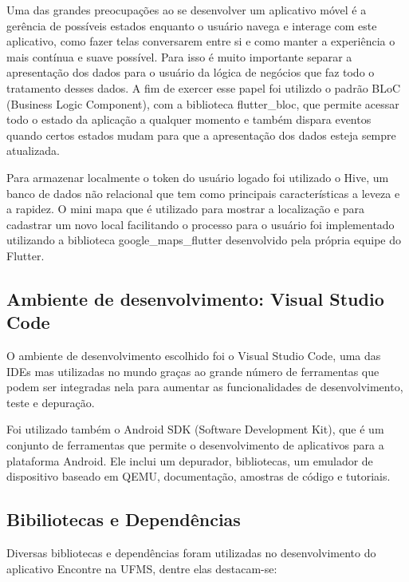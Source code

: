 Uma das grandes preocupações ao se desenvolver um aplicativo móvel é a gerência de possíveis estados enquanto o usuário navega e interage com este aplicativo, como fazer telas conversarem entre si e como manter a experiência o mais contínua e suave possível. Para isso é muito importante separar a apresentação dos dados para o usuário da lógica de negócios que faz todo o tratamento desses dados. A fim de exercer esse papel foi utilizdo o padrão BLoC (Business Logic Component), com a biblioteca flutter\_bloc, que permite acessar todo o estado da aplicação a qualquer momento e também dispara eventos quando certos estados mudam para que a apresentação dos dados esteja sempre atualizada.

Para armazenar localmente o token do usuário logado foi utilizado o Hive, um banco de dados não relacional que tem como principais características a leveza e a rapidez. O mini mapa que é utilizado para mostrar a localização e para cadastrar um novo local facilitando o processo para o usuário foi implementado utilizando a biblioteca google\_maps\_flutter desenvolvido pela própria equipe do Flutter. 

\subsection{Ambiente de desenvolvimento: Visual Studio Code}
O ambiente de desenvolvimento escolhido foi o Visual Studio Code, uma das IDEs mas utilizadas no mundo graças ao grande número de ferramentas que podem ser integradas nela para aumentar as funcionalidades de desenvolvimento, teste e depuração.

Foi utilizado também o Android SDK (Software Development Kit), que é um conjunto de ferramentas que permite o desenvolvimento de aplicativos para a plataforma Android. Ele inclui um depurador, bibliotecas, um emulador de dispositivo baseado em QEMU, documentação, amostras de código e tutoriais.

\subsection{Bibiliotecas e Dependências}
Diversas bibliotecas e dependências foram utilizadas no desenvolvimento do aplicativo Encontre na UFMS, dentre elas destacam-se:


